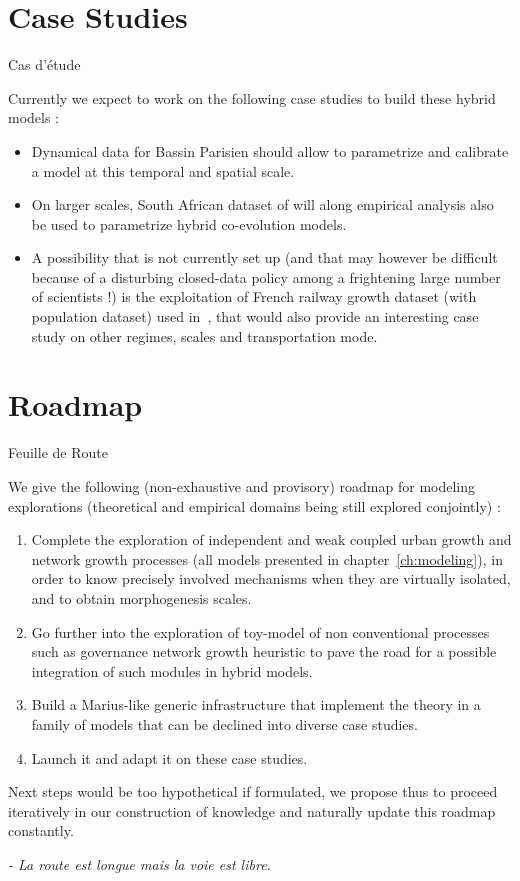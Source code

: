 \section*{Case Studies}{Cas d'étude}

Currently we expect to work on the following case studies to build these hybrid models :

\begin{itemize}
\item Dynamical data for Bassin Parisien should allow to parametrize and calibrate a model at this temporal and spatial scale.
\item On larger scales, South African dataset of  will along empirical analysis also be used to parametrize hybrid co-evolution models.
\item A possibility that is not currently set up (and that may however be difficult because of a disturbing closed-data policy among a frightening large number of scientists !) is the exploitation of French railway growth dataset (with population dataset) used in~\cite{bretagnolle:tel-00459720}, that would also provide an interesting case study on other regimes, scales and transportation mode.
\end{itemize}






\section*{Roadmap}{Feuille de Route}


We give the following (non-exhaustive and provisory) roadmap for modeling explorations (theoretical and empirical domains being still explored conjointly) :

\begin{enumerate}
\item Complete the exploration of independent and weak coupled urban growth and network growth processes (all models presented in chapter~\ref{ch:modeling}), in order to know precisely involved mechanisms when they are virtually isolated, and to obtain morphogenesis scales.
\item Go further into the exploration of toy-model of non conventional processes such as governance network growth heuristic to pave the road for a possible integration of such modules in hybrid models.
\item Build a Marius-like generic infrastructure that implement the theory in a family of models that can be declined into diverse case studies.
\item Launch it and adapt it on these case studies.
\end{enumerate}

Next steps would be too hypothetical if formulated, we propose thus to proceed iteratively in our construction of knowledge and naturally update this roadmap constantly.

\bigskip
\bigskip
\bigskip

\textit{ - La route est longue mais la voie est libre.}







